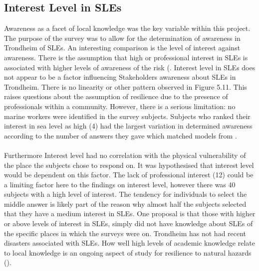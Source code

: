 \subsection{Interest Level in SLEs}
Awareness as a facet of local knowledge was the key variable within this project. The purpose of the survey was to allow for the determination of awareness in Trondheim of SLEs. An interesting comparison is the level of interest against awareness. There is the assumption that high or professional interest in SLEs is associated with higher levels of awareness of the risk (\cite{lujala_quantifying_2014}. Interest level in SLEs does not appear to be a factor influencing Stakeholders awareness about SLEs in Trondheim. There is no linearity or other pattern observed in Figure 5.11. This raises questions about the assumption of resilience due to the presence of professionals within a community. However, there is a serious limitation: no marine workers were identified in the survey subjects. Subjects who ranked their interest in sea level as high (4) had the largest variation in determined awareness according to the number of answers they gave which matched models from \cite{kartverket_se_2020}.
\paragraph{}
Furthermore Interest level had no correlation with the physical vulnerability of the place the subjects chose to respond on. It was hypothesised that interest level would be dependent on this factor. The lack of professional interest (12) could be a limiting factor here to the findings on interest level, however there was 40 subjects with a high level of interest. The tendency for individuals to select the middle answer is  likely part of the reason why almost half the subjects selected that they have a medium interest in SLEs. One proposal is that those with higher or above levels of interest in SLEs, simply did not have knowledge about SLEs of the specific places in which the surveys were on. Trondheim has not had recent disasters associated with SLEs. How well high levels of academic knowledge relate to local knowledge is an ongoing aspect of study for resilience to natural hazards (\cite{lujala_role_2020}).
\paragraph{}



   

